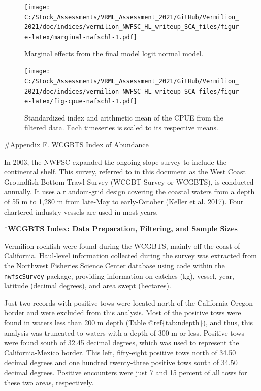 \documentclass[11pt,
  english,
]{article}
\begin{document}
\begin{figure}
\centering
\texttt{[image: C:/Stock\_Assessments/VRML\_Assessment\_2021/GitHub/Vermilion\_2021/doc/indices/vermilion\_NWFSC\_HL\_writeup\_SCA\_files/figure-latex/marginal-nwfschl-1.pdf]}
\caption{\label{fig:marginal-nwfschl}Marginal effects from the final model logit normal model.}
\end{figure}

\begin{figure}
\centering
\texttt{[image: C:/Stock\_Assessments/VRML\_Assessment\_2021/GitHub/Vermilion\_2021/doc/indices/vermilion\_NWFSC\_HL\_writeup\_SCA\_files/figure-latex/fig-cpue-nwfschl-1.pdf]}
\caption{\label{fig:fig-cpue-nwfschl}Standardized index and arithmetic mean of the CPUE from the filtered data. Each timeseries is scaled to its respective means.}
\end{figure}

\clearpage

\#Appendix F. WCGBTS Index of Abundance

\renewcommand{\thepage}{F\arabic{page}}
\renewcommand{\thefigure}{F\arabic{figure}}
\renewcommand{\thetable}{F\arabic{table}}
\setcounter{page}{1}
\setcounter{figure}{0}
\setcounter{table}{0}

In 2003, the NWFSC expanded the ongoing slope survey to include the continental shelf. This survey, referred to in this document as the West Coast Groundfish Bottom Trawl Survey (WCGBT Survey or WCGBTS), is conducted annually. It uses a r andom-grid design covering the coastal waters from a depth of 55 m to 1,280 m from late-May to early-October {(Keller et al. 2017)\leavevmode\tagmcend\tagstructend}. Four chartered industry vessels are used in most years.

*\textbf{WCGBTS Index: Data Preparation, Filtering, and Sample Sizes}

Vermilion rockfish were found during the WCGBTS, mainly off the coast of California. Haul-level information collected during the survey was extracted from the {\href{https://www.webapps.nwfsc.noaa.gov/data}{Northwest Fisheries Science Center database}\leavevmode\tagmcend\tagstructend} using code within the \texttt{nwfscSurvey} package, providing information on catches (kg), vessel, year, latitude (decimal degrees), and area swept (hectares).

Just two records with positive tows were located north of the California-Oregon border and were excluded from this analysis. Most of the positive tows were found in waters less than 200 m depth (Table @ref\{tab:ndepth\}), and thus, this analysis was truncated to waters with a depth of 300 m or less. Positive tows were found south of 32.45 decimal degrees, which was used to represent the California-Mexico border. This left, fifty-eight positive tows north of 34.50 decimal degrees and one hundred twenty-three positive tows south of 34.50 decimal degrees. Positive encounters were just 7 and 15 percent of all tows for these two areas, respectively.
\end{document}
